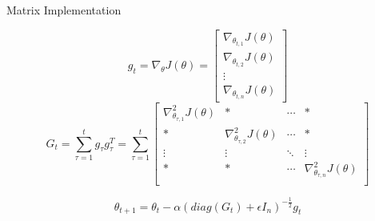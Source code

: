 \documentclass{beamer}
\begin{document}
\begin{frame}{Matrix Implementation}
\begin{theorem}
    $$ g_{t} = \nabla_{\theta}J(\theta) = 
    \begin{bmatrix} 
        \nabla_{\theta_{t,1}}J(\theta) \\ 
        \nabla_{\theta_{t,2}}J(\theta) \\
        \vdots \\
        \nabla_{\theta_{t,n}}J(\theta) 
        
\end{bmatrix}$$
    $$ G_{t} = \sum_{\tau=1}^t g_{\tau}g_{\tau} ^T = \sum_{\tau=1}^t
    \begin{bmatrix} 
        \nabla_{\theta_{\tau,1}}^2J(\theta) & \ast & \cdots & \ast\\ 
        \ast & \nabla_{\theta_{\tau,2}}^2J(\theta) & \cdots & \ast\\
        \vdots & \vdots & \ddots & \vdots \\ 
        \ast & \ast & \cdots & \nabla_{\theta_{\tau,n}}^2J(\theta) \\ 
    \end{bmatrix}$$
    
    $$\theta_{t+1} = \theta_{t} - \alpha  (diag(G_t) +\epsilon I_n)^{-\frac{1}{2}}  g_{t}$$
    
\end{theorem}

\end{frame}
\end{document}
